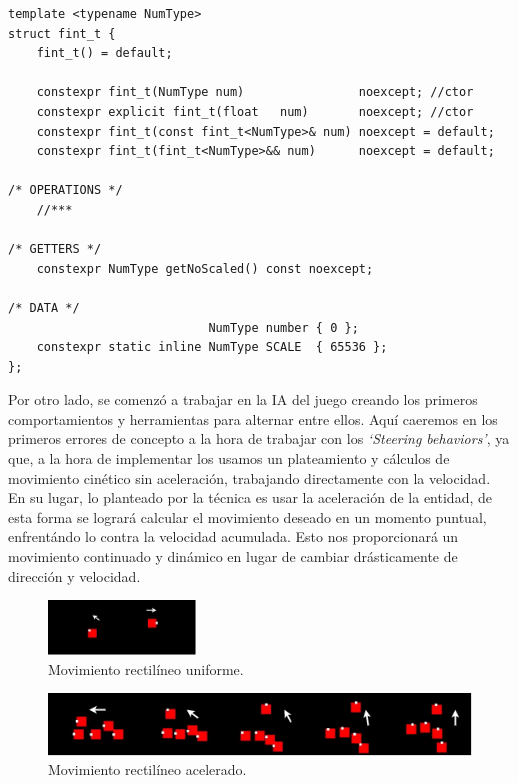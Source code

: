\begin{lstlisting}[style=CodigoC++, caption={Entero coma fija},label=fint_t]
template <typename NumType>
struct fint_t {
	fint_t() = default;

	constexpr fint_t(NumType num)                noexcept; //ctor
	constexpr explicit fint_t(float   num)       noexcept; //ctor
	constexpr fint_t(const fint_t<NumType>& num) noexcept = default; 
	constexpr fint_t(fint_t<NumType>&& num)      noexcept = default;

/* OPERATIONS */
	//***

/* GETTERS */
	constexpr NumType getNoScaled() const noexcept;
	
/* DATA */    
							NumType number { 0 };
	constexpr static inline NumType SCALE  { 65536 };
};
\end{lstlisting}


Por otro lado, se comenzó a trabajar en la \ac{IA} del juego creando los primeros comportamientos
y herramientas para alternar entre ellos. Aquí caeremos en los primeros errores de concepto a la
hora de trabajar con los \textit{`Steering behaviors'}, ya que, a la hora de implementar los
usamos un plateamiento y cálculos de movimiento cinético sin aceleración, trabajando directamente 
con la velocidad.\\
En su lugar, lo planteado por la técnica es usar la aceleración de la entidad, de esta forma se 
logrará calcular el movimiento deseado en un momento puntual, enfrentándo lo contra la velocidad 
acumulada. Esto nos proporcionará un movimiento continuado y dinámico en lugar de cambiar drásticamente de 
dirección y velocidad.

\begin{figure}[htb]
\centering
\includegraphics[width=0.35\textwidth]{imagenes/diario_desarrollo/mov1.png}
\caption{Movimiento rectilíneo uniforme.}
\label{fig:mru}
\end{figure} 

\begin{figure}[htb]
\centering
\includegraphics[width=1\textwidth]{imagenes/diario_desarrollo/mov2.png}
\caption{Movimiento rectilíneo acelerado.}
\label{fig:mra}
\end{figure} 

